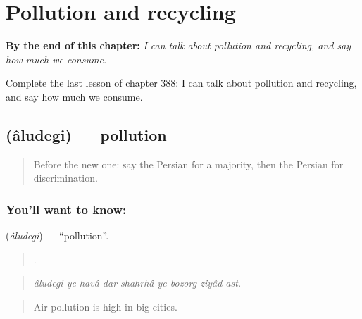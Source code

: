 
\chapter{Pollution and recycling}
\label{ch:fa-pollution-and-recycling}

\begin{chapteropening}
\textbf{By the end of this chapter:} \emph{I can talk about pollution and recycling, and say how much we consume.}

Complete the last lesson of chapter 388: I can talk about pollution and recycling, and say how much we consume.
\end{chapteropening}

\section[\texorpdfstring{\fa{آلودگی} (âludegi)}{آلودگی (âludegi)}]{ (âludegi) — pollution}

\label{lesson:FA-C388-aludegi}



\begin{quote}
Before the new one: say the Persian for a majority, then the Persian for discrimination.
\end{quote}

\subsection*{You'll want to know: }
\textbf{} (\emph{âludegi}) — \textquotedblleft{}pollution\textquotedblright{}.

\begin{quote}
      .
\end{quote}

\begin{quote}
\emph{âludegi-ye havâ dar shahrhâ-ye bozorg ziyâd ast.}
\end{quote}

\begin{quote}
Air pollution is high in big cities.
\end{quote}


